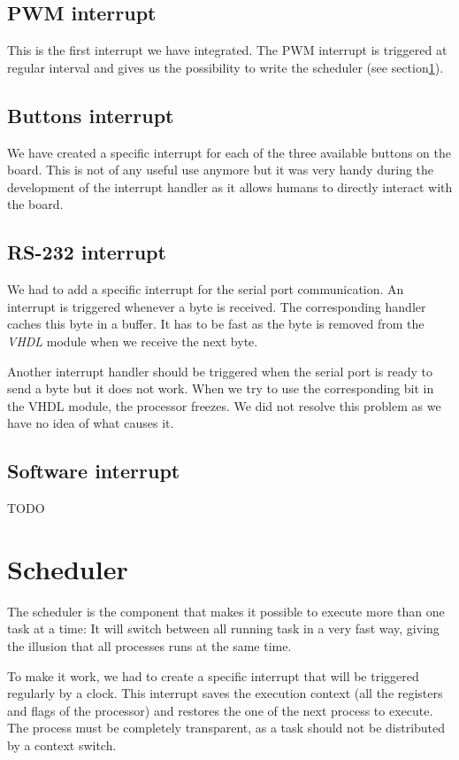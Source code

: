 \documentclass[openany, a4paper]{book}
\begin{document}
      \subsection{PWM interrupt}
        This is the first interrupt we have integrated. The PWM interrupt is
        triggered at regular interval and gives us the possibility to write the
        scheduler (see section\ref{sec:scheduler}).

      \subsection{Buttons interrupt}
        We have created a specific interrupt for each of the three available
        buttons on the board. This is not of any useful use anymore but it was
        very handy during the development of the interrupt handler as it allows
        humans to directly interact with the board.

      \subsection{RS-232 interrupt}
        We had to add a specific interrupt for the serial port communication.
        An interrupt is triggered whenever a byte is received. The corresponding
        handler caches this byte in a buffer. It has to be fast as the byte
        is removed from the \emph{VHDL} module when we receive the next byte.

        Another interrupt handler should be triggered when the serial port is
        ready to send a byte but it does not work. When we try to use the
        corresponding bit in the VHDL module, the processor freezes. We did not
        resolve this problem as we have no idea of what causes it.

      \subsection{Software interrupt}
      TODO

    \section{Scheduler}\label{sec:scheduler}
      The scheduler is the component that makes it possible to execute more than
      one task at a time: It will switch between all running task in a very fast
      way, giving the illusion that all processes runs at the same time.

      To make it work, we had to create a specific interrupt that will be
      triggered regularly by a clock. This interrupt saves the execution
      context (all the registers and flags of the processor) and restores the
      one of the next process to execute. The process must be completely
      transparent, as a task should not be distributed by a context switch.
\end{document}
